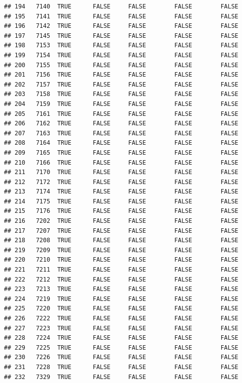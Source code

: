 \documentclass[
  10pt,
  b5paper,
  oneside]{book}
\begin{document}
\begin{verbatim}
## 194   7140  TRUE      FALSE     FALSE        FALSE        FALSE
## 195   7141  TRUE      FALSE     FALSE        FALSE        FALSE
## 196   7142  TRUE      FALSE     FALSE        FALSE        FALSE
## 197   7145  TRUE      FALSE     FALSE        FALSE        FALSE
## 198   7153  TRUE      FALSE     FALSE        FALSE        FALSE
## 199   7154  TRUE      FALSE     FALSE        FALSE        FALSE
## 200   7155  TRUE      FALSE     FALSE        FALSE        FALSE
## 201   7156  TRUE      FALSE     FALSE        FALSE        FALSE
## 202   7157  TRUE      FALSE     FALSE        FALSE        FALSE
## 203   7158  TRUE      FALSE     FALSE        FALSE        FALSE
## 204   7159  TRUE      FALSE     FALSE        FALSE        FALSE
## 205   7161  TRUE      FALSE     FALSE        FALSE        FALSE
## 206   7162  TRUE      FALSE     FALSE        FALSE        FALSE
## 207   7163  TRUE      FALSE     FALSE        FALSE        FALSE
## 208   7164  TRUE      FALSE     FALSE        FALSE        FALSE
## 209   7165  TRUE      FALSE     FALSE        FALSE        FALSE
## 210   7166  TRUE      FALSE     FALSE        FALSE        FALSE
## 211   7170  TRUE      FALSE     FALSE        FALSE        FALSE
## 212   7172  TRUE      FALSE     FALSE        FALSE        FALSE
## 213   7174  TRUE      FALSE     FALSE        FALSE        FALSE
## 214   7175  TRUE      FALSE     FALSE        FALSE        FALSE
## 215   7176  TRUE      FALSE     FALSE        FALSE        FALSE
## 216   7202  TRUE      FALSE     FALSE        FALSE        FALSE
## 217   7207  TRUE      FALSE     FALSE        FALSE        FALSE
## 218   7208  TRUE      FALSE     FALSE        FALSE        FALSE
## 219   7209  TRUE      FALSE     FALSE        FALSE        FALSE
## 220   7210  TRUE      FALSE     FALSE        FALSE        FALSE
## 221   7211  TRUE      FALSE     FALSE        FALSE        FALSE
## 222   7212  TRUE      FALSE     FALSE        FALSE        FALSE
## 223   7213  TRUE      FALSE     FALSE        FALSE        FALSE
## 224   7219  TRUE      FALSE     FALSE        FALSE        FALSE
## 225   7220  TRUE      FALSE     FALSE        FALSE        FALSE
## 226   7222  TRUE      FALSE     FALSE        FALSE        FALSE
## 227   7223  TRUE      FALSE     FALSE        FALSE        FALSE
## 228   7224  TRUE      FALSE     FALSE        FALSE        FALSE
## 229   7225  TRUE      FALSE     FALSE        FALSE        FALSE
## 230   7226  TRUE      FALSE     FALSE        FALSE        FALSE
## 231   7228  TRUE      FALSE     FALSE        FALSE        FALSE
## 232   7329  TRUE      FALSE     FALSE        FALSE        FALSE

\end{verbatim}
\end{document}
